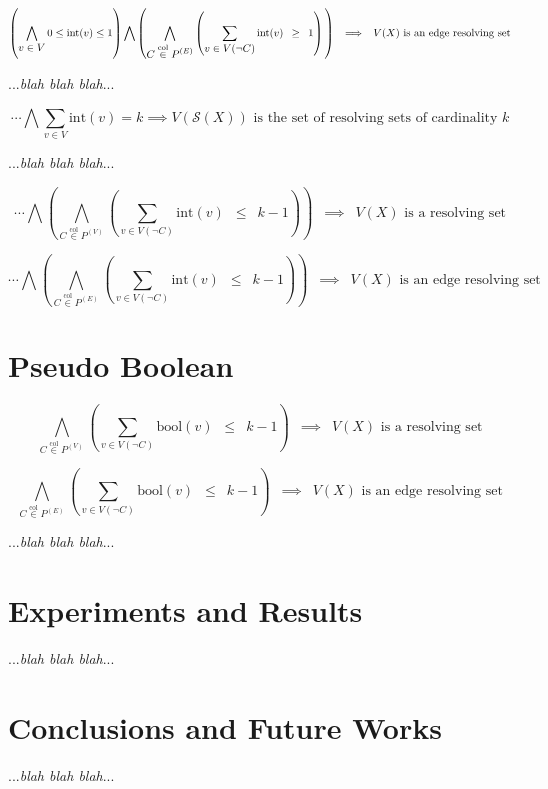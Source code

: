 \documentclass{article}
\newcommand{\combine}[7]{#1 #2 \vphantom{#6} #3 #4 #5 #6 \vphantom{#2} #7}
\begin{document}
	\[ \combine{\left(}{\bigwedge \limits_{\displaystyle v \in V} 0 \leq \mathrm{int}(v) \leq 1}{\right)}{\bigwedge}{\left(}{\bigwedge \limits_{\displaystyle C \overset{\mathrm{col}}{\in} P^{(E)}} \left( \sum \limits_{\displaystyle v \in V(\neg C)} \mathrm{int}(v)\enspace \geq\enspace 1 \right)}{\right)}\enspace \implies\enspace V(X) \text{ is an edge resolving set} \]

	...\textit{blah blah blah}...

	\[ \cdots \bigwedge \sum \limits_{\displaystyle v \in V} \mathrm{int}(v) = k \implies V(\mathcal{S}(X)) \text{ is the set of resolving sets of cardinality } k \]

	...\textit{blah blah blah}...

	\[ \cdots \bigwedge \left( \bigwedge \limits_{\displaystyle C \overset{\mathrm{col}}{\in} P^{(V)}} \left( \sum \limits_{\displaystyle v \in V(\neg C)} \mathrm{int}(v)\enspace \leq\enspace k - 1 \right) \right)\enspace \implies\enspace V(X) \text{ is a resolving set} \]

	\[ \cdots \bigwedge \left( \bigwedge \limits_{\displaystyle C \overset{\mathrm{col}}{\in} P^{(E)}} \left( \sum \limits_{\displaystyle v \in V(\neg C)} \mathrm{int}(v)\enspace \leq\enspace k - 1 \right) \right)\enspace \implies\enspace V(X) \text{ is an edge resolving set} \]

	\clearpage
	\section{Pseudo Boolean}

	\[ \bigwedge \limits_{\displaystyle C \overset{\mathrm{col}}{\in} P^{(V)}} \left( \sum \limits_{\displaystyle v \in V(\neg C)} \mathrm{bool}(v)\enspace \leq\enspace k - 1 \right)\enspace \implies\enspace V(X) \text{ is a resolving set} \]

	\[ \bigwedge \limits_{\displaystyle C \overset{\mathrm{col}}{\in} P^{(E)}} \left( \sum \limits_{\displaystyle v \in V(\neg C)} \mathrm{bool}(v)\enspace \leq\enspace k - 1 \right)\enspace \implies\enspace V(X) \text{ is an edge resolving set} \]

	...\textit{blah blah blah}...

	\clearpage
	\section{Experiments and Results}

	...\textit{blah blah blah}...

	\section{Conclusions and Future Works}

	...\textit{blah blah blah}...
\end{document}

